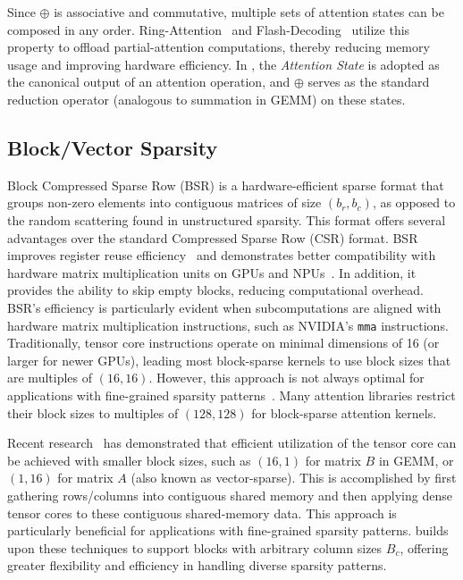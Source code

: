 Since \(\oplus\) is associative and commutative, multiple sets of attention states can be composed in any order. Ring-Attention~\cite{liu2023ring} and Flash-Decoding~\cite{dao2023flash-decoding} utilize this property to offload partial-attention computations, thereby reducing memory usage and improving hardware efficiency. In \sys, the \emph{Attention State} is adopted as the canonical output of an attention operation, and \(\oplus\) serves as the standard reduction operator (analogous to summation in GEMM) on these states.

\subsection{Block/Vector Sparsity}

\label{sec:block-sparse}

Block Compressed Sparse Row (BSR) is a hardware-efficient sparse format that groups non-zero elements into contiguous matrices of size $(b_r, b_c)$, as opposed to the random scattering found in unstructured sparsity. This format offers several advantages over the standard Compressed Sparse Row (CSR) format. BSR improves register reuse efficiency~\cite{im2004blocksparsity, buluc2009bsr} and demonstrates better compatibility with hardware matrix multiplication units on GPUs and NPUs~\cite{narang2017bsr-rnn,gray2017gpu-bsr}. In addition, it provides the ability to skip empty blocks, reducing computational overhead. BSR's efficiency is particularly evident when subcomputations are aligned with hardware matrix multiplication instructions, such as NVIDIA's \texttt{mma} instructions.
Traditionally, tensor core instructions operate on minimal dimensions of 16 (or larger for newer GPUs), leading most block-sparse kernels to use block sizes that are multiples of $(16, 16)$. However, this approach is not always optimal for applications with fine-grained sparsity patterns~\cite{wang2023tcgnn}. Many attention libraries restrict their block sizes to multiples of $(128, 128)$ for block-sparse attention kernels.

Recent research~\cite{chen2021tensorcoressparsity, li2022magicube} has demonstrated that efficient utilization of the tensor core can be achieved with smaller block sizes, such as $(16, 1)$ for matrix $B$ in GEMM, or $(1, 16)$ for matrix $A$ (also known as vector-sparse). This is accomplished by first gathering rows/columns into contiguous shared memory and then applying dense tensor cores to these contiguous shared-memory data. This approach is particularly beneficial for applications with fine-grained sparsity patterns.
\sys builds upon these techniques to support blocks with arbitrary column sizes $B_c$, offering greater flexibility and efficiency in handling diverse sparsity patterns.
